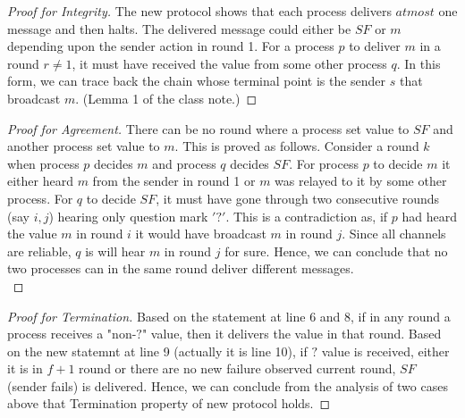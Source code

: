 \documentclass[11pt,a4paper]{article}
\begin{document}
\begin{proof}[Proof for Integrity]
The new protocol shows that each process delivers $at most$ one message and
then halts. The delivered message could either be $SF$ or $m$ depending upon
the sender action in round 1. For a process $p$ to deliver $m$ in a round $r
\neq 1$, it must have received the value from some other process $q$. In this
form, we can trace back the chain whose terminal point is the sender $s$ that
broadcast $m$. (Lemma 1 of the class note.)
\end{proof}
  
\begin{proof}[Proof for Agreement]
There can be no round where a process set value to $SF$ and another process
set value to $m$. This is proved as follows. Consider a round $k$ when process
$p$ decides $m$ and process $q$ decides $SF$. For process $p$ to decide $m$ it
either heard $m$ from the sender in round 1 or $m$ was relayed to it by some
other process. For $q$ to decide $SF$, it must have gone through two
consecutive rounds (say $i,j$) hearing only question mark $'?'$.
This is a contradiction as, if $p$ had heard the value $m$ in round $i$ it
would have broadcast $m$ in round $j$. Since all channels are reliable, $q$ is
will hear $m$ in round $j$ for sure. 
Hence, we can conclude that no two processes can in the same round deliver different messages.  \\
\end{proof}

\begin{proof}[Proof for Termination]
    Based on the statement at line 6 and 8, if in any round a process receives
    a "non-$?$" value, then it delivers the value in that round.
    Based on the new statemnt at line 9 (actually it is line 10), if $?$ value
    is received, either it is in $f+1$ round or there are no new failure
    observed current round, $SF$ (sender fails) is delivered.
    Hence, we can conclude from the analysis of two cases above that
    Termination property of new protocol holds.
\end{proof}
\end{document}
